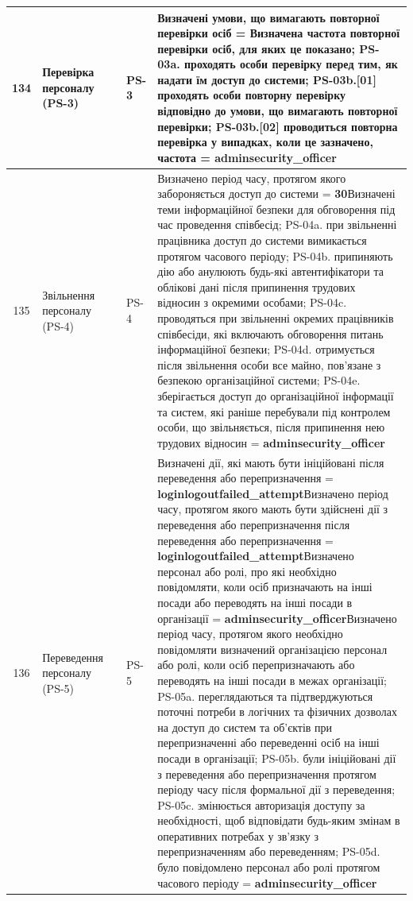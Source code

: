 \documentclass[10pt]{article}
\begin{document}
\begin{longtable}{|c|>{\raggedright\arraybackslash}p{2.5cm}|>{\raggedright\arraybackslash}p{4.5cm}|>{\raggedright\arraybackslash}p{3cm}|>{\raggedright\arraybackslash}p{4.5cm}|}
134 & Перевірка персоналу (PS-3) &  & PS-3 & Визначені умови, що вимагають повторної перевірки осіб = \textbf{}\newline Визначена частота повторної перевірки осіб, для яких це показано; PS-03a. проходять особи перевірку перед тим, як надати їм доступ до системи; PS-03b.[01] проходять особи повторну перевірку відповідно до умови, що вимагають повторної перевірки; PS-03b.[02] проводиться повторна перевірка у випадках, коли це зазначено, частота = \textbf{adminsecurity\_\allowbreak{}officer} \\ \hline
135 & Звільнення персоналу (PS-4) &  & PS-4 & Визначено період часу, протягом якого забороняється доступ до системи = \textbf{30}\newline Визначені теми інформаційної безпеки для обговорення під час проведення співбесід; PS-04a. при звільненні працівника доступ до системи вимикається протягом часового періоду; PS-04b. припиняють дію або анулюють будь-які автентифікатори та облікові дані після припинення трудових відносин з окремими особами; PS-04c. проводяться при звільненні окремих працівників співбесіди, які включають обговорення питань інформаційної безпеки; PS-04d. отримується після звільнення особи все майно, пов'язане з безпекою організаційної системи; PS-04e. зберігається доступ до організаційної інформації та систем, які раніше перебували під контролем особи, що звільняється, після припинення нею трудових відносин = \textbf{adminsecurity\_\allowbreak{}officer} \\ \hline
136 & Переведення персоналу (PS-5) &  & PS-5 & Визначені дії, які мають бути ініційовані після переведення або перепризначення = \textbf{loginlogoutfailed\_\allowbreak{}attempt}\newline Визначено період часу, протягом якого мають бути здійснені дії з переведення або перепризначення після переведення або перепризначення = \textbf{loginlogoutfailed\_\allowbreak{}attempt}\newline Визначено персонал або ролі, про які необхідно повідомляти, коли осіб призначають на інші посади або переводять на інші посади в організації = \textbf{adminsecurity\_\allowbreak{}officer}\newline Визначено період часу, протягом якого необхідно повідомляти визначений організацією персонал або ролі, коли осіб перепризначають або переводять на інші посади в межах організації; PS-05a. переглядаються та підтверджуються поточні потреби в логічних та фізичних дозволах на доступ до систем та об'єктів при перепризначенні або переведенні осіб на інші посади в організації; PS-05b. були ініційовані дії з переведення або перепризначення протягом періоду часу після формальної дії з переведення; PS-05c. змінюється авторизація доступу за необхідності, щоб відповідати будь-яким змінам в оперативних потребах у зв'язку з перепризначенням або переведенням; PS-05d. було повідомлено персонал або ролі протягом часового періоду = \textbf{adminsecurity\_\allowbreak{}officer} \\ \hline

\end{longtable}
\end{document}
